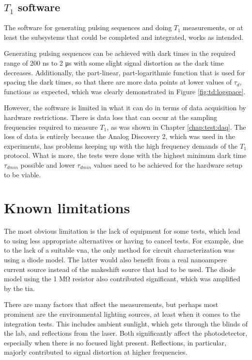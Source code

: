 \subsection{$T_1$ software}
The software for generating pulsing sequences and doing $T_1$ measurements, or at least the subsystems that could be completed and integrated, works as intended. 

Generating pulsing sequences can be achieved with dark times in the required range of 200 \unit{\nano\second} to 2 \unit{\micro\second} with some slight signal distortion as the dark time decreases. Additionally, the part-linear, part-logarithmic function that is used for spacing the dark times, so that there are more data points at lower values of $\tau_{d}$, functions as expected, which was clearly demonstrated in Figure \ref{fig:td:logspace}.

However, the software is limited in what it can do in terms of data acquisition by hardware restrictions. There is data loss that can occur at the sampling frequencies required to measure $T_1$, as was shown in Chapter \ref{chap:test:daq}. The loss of data is entirely because the Analog Discovery 2, which was used in the experiments, has problems keeping up with the high frequency demands of the $T_1$ protocol. What is more, the tests were done with the highest minimum dark time $\tau_{dmin}$ possible and lower $\tau_{dmin}$ values need to be achieved for the hardware setup to be viable.


\section{Known limitations}
The most obvious limitation is the lack of equipment for some tests, which lead to using less appropriate alternatives or having to cancel tests. For example, due to the lack of a suitable \gls{vna}, the only method for circuit characterization was using a diode model. The latter would also benefit from a real nanoampere current source instead of the makeshift source that had to be used. The diode model using the 1 \unit{\mega\ohm} resistor also contributed significant, which was amplified by the \gls{tia}.

There are many factors that affect the measurements, but perhaps most prominent are the environmental lighting sources, at least when it comes to the integration tests. This includes ambient sunlight, which gets through the blinds of the lab, and reflections from the laser. Both significantly affect the photodetector, especially when there is no focused light present. Reflections, in particular, majorly contributed to signal distortion at higher frequencies.

